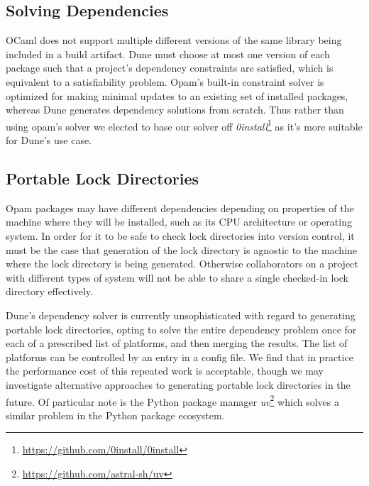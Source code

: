 \documentclass{article}
\begin{document}
\begin{multicols}{2}
        \subsection {Solving Dependencies}

        OCaml does not support multiple different versions of the same library
        being included in a build artifact. Dune must choose at most one version
        of each package such that a project's dependency constraints are
        satisfied, which is equivalent to a satisfiability problem. Opam's
        built-in constraint solver is optimized for making minimal updates to an
        existing set of installed packages, whereas Dune generates dependency solutions
        from scratch. Thus rather than using opam's solver we elected to base our solver off
        \textit{0install}\footnote{\url{https://github.com/0install/0install}}
        as it's more suitable for Dune's use case.

        \subsection {Portable Lock Directories}

        Opam packages may have different dependencies depending on properties of
        the machine where they will be installed, such as its CPU architecture
        or operating system. In order for it to be safe to check lock
        directories into version control, it must be the case that generation of
        the lock directory is agnostic to the machine where the lock directory
        is being generated. Otherwise collaborators on a project with different
        types of system will not be able to share a single checked-in lock
        directory effectively.

        Dune's dependency solver is currently unsophisticated with regard to
        generating portable lock directories, opting to solve the entire
        dependency problem once for each of a prescribed list of platforms, and
        then merging the results. The list of platforms can be controlled by an
        entry in a config file. We find that in practice the performance cost of
        this repeated work is acceptable, though we may investigate alternative
        approaches to generating portable lock directories in the future. Of
        particular note is the Python package manager
        \textit{uv}\footnote{\url{https://github.com/astral-sh/uv}} which solves a
        similar problem in the Python package ecosystem.


\end{multicols}
\end{document}
